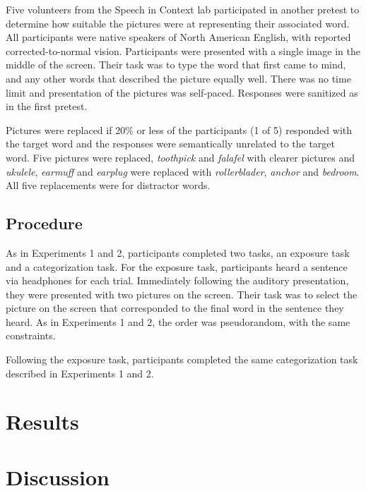 Five volunteers from the Speech in Context lab participated in another pretest to determine how suitable the pictures were at representing their associated word.  All participants were native speakers of North American English, with reported corrected-to-normal vision. Participants were presented with a single image in the middle of the screen.  Their task was to type the word that first came to mind, and any other words that described the picture equally well.  There was no time limit and presentation of the pictures was self-paced. Responses were sanitized as in the first pretest.  

Pictures were replaced if 20\% or less of the participants (1 of 5) responded with the target word and the responses were semantically unrelated to the target word. Five pictures were replaced, \emph{toothpick} and \emph{falafel} with clearer pictures and \emph{ukulele}, \emph{earmuff} and \emph{earplug} were replaced with \emph{rollerblader}, \emph{anchor} and \emph{bedroom}.  All five replacements were for distractor words.

\subsection{Procedure}

As in Experiments 1 and 2, participants completed two tasks, an exposure task and a categorization task.  For the exposure task, participants heard a sentence via headphones for each trial.  Immediately following the auditory presentation, they were presented with two pictures on the screen.  Their task was to select the picture on the screen that corresponded to the final word in the sentence they heard.  As in Experiments 1 and 2, the order was pseudorandom, with the same constraints.

Following the exposure task, participants completed the same categorization task described in Experiments 1 and 2.

\section{Results}

\section{Discussion}
